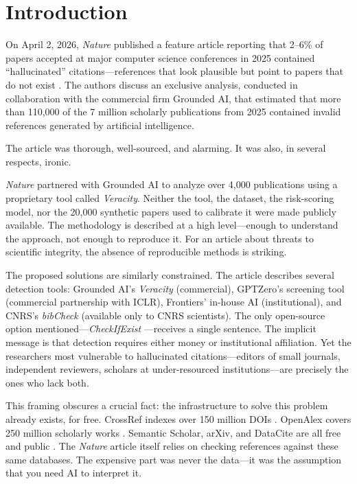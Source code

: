 \section{Introduction}

On April 2, 2026, \textit{Nature} published a feature article reporting that 2--6\% of papers accepted at major computer science conferences in 2025 contained ``hallucinated'' citations---references that look plausible but point to papers that do not exist \citep{naddaf2026}. The authors discuss an exclusive analysis, conducted in collaboration with the commercial firm Grounded AI, that estimated that more than 110{,}000 of the 7 million scholarly publications from 2025 contained invalid references generated by artificial intelligence.

The article was thorough, well-sourced, and alarming. It was also, in several respects, ironic.

\textit{Nature} partnered with Grounded AI to analyze over 4{,}000 publications using a proprietary tool called \emph{Veracity}. Neither the tool, the dataset, the risk-scoring model, nor the 20{,}000 synthetic papers used to calibrate it were made publicly available. The methodology is described at a high level---enough to understand the approach, not enough to reproduce it. For an article about threats to scientific integrity, the absence of reproducible methods is striking.

The proposed solutions are similarly constrained. The article describes several detection tools: Grounded AI's \emph{Veracity} (commercial), GPTZero's screening tool (commercial partnership with ICLR), Frontiers' in-house AI (institutional), and CNRS's \emph{bibCheck} (available only to CNRS scientists). The only open-source option mentioned---\emph{CheckIfExist} \citep{abbonato2026}---receives a single sentence. The implicit message is that detection requires either money or institutional affiliation. Yet the researchers most vulnerable to hallucinated citations---editors of small journals, independent reviewers, scholars at under-resourced institutions---are precisely the ones who lack both.

This framing obscures a crucial fact: the infrastructure to solve this problem already exists, for free. CrossRef indexes over 150 million DOIs \citep{crossref2026}. OpenAlex covers 250 million scholarly works \citep{openalex2026}. Semantic Scholar, arXiv, and DataCite are all free and public \citep{semanticscholar2026}. The \textit{Nature} article itself relies on checking references against these same databases. The expensive part was never the data---it was the assumption that you need AI to interpret it.

